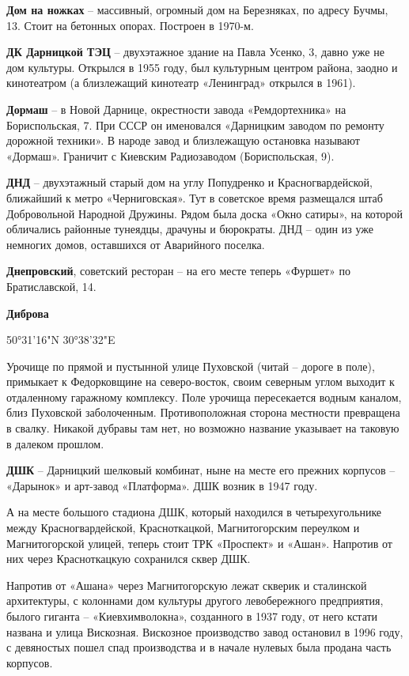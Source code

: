 \medskip

\textbf{Дом на ножках} – массивный, огромный дом на Березняках, по адресу Бучмы, 13. Стоит на бетонных опорах. Построен в 1970-м.\\

\medskip

\textbf{ДК Дарницкой ТЭЦ} – двухэтажное здание на Павла Усенко, 3, давно уже не дом культуры. Открылся в 1955 году, был культурным центром района, заодно и кинотеатром (а близлежащий кинотеатр «Ленинград» открылся в 1961).\\ 

\medskip

\textbf{Дормаш} – в Новой Дарнице, окрестности завода «Ремдортехника» на Бориспольская, 7. При СССР он именовался «Дарницким заводом по ремонту дорожной техники». В народе завод и близлежащую остановка называют «Дормаш». Граничит с Киевским Радиозаводом (Бориспольская, 9).\\

\medskip

\textbf{ДНД} – двухэтажный старый дом на углу Попудренко и Красногвардейской, ближайший к метро «Черниговская». Тут в советское время размещался штаб Добровольной Народной Дружины. Рядом была доска «Окно сатиры», на которой обличались районные тунеядцы, драчуны и бюрократы. ДНД – один из уже немногих домов, оставшихся от Аварийного поселка.\\

\medskip

\textbf{Днепровский}, советский ресторан – на его месте теперь «Фуршет» по Братиславской, 14.\\

\medskip

\textbf{Диброва}

50°31'16"N 30°38'32"E 

Урочище по прямой и пустынной улице Пуховской (читай – дороге в поле), примыкает к Федорковщине на северо-восток, своим северным углом выходит к отдаленному гаражному комплексу. Поле урочища пересекается водным каналом, близ Пуховской заболоченным. Противоположная сторона местности превращена в свалку. Никакой дубравы там нет, но возможно название указывает на таковую в далеком прошлом.\\

\medskip

\textbf{ДШК} – Дарницкий шелковый комбинат, ныне на месте его прежних корпусов – «Дарынок» и арт-завод «Платформа». ДШК возник в 1947 году.

А на месте большого стадиона ДШК, который находился в четырехугольнике между Красногвардейской, Красноткацкой, Магнитогорским переулком и Магнитогорской улицей, теперь стоит ТРК «Проспект» и «Ашан». Напротив от них через Красноткацкую сохранился сквер ДШК. 

Напротив от «Ашана» через Магнитогорскую лежат скверик и сталинской архитектуры, с колоннами дом культуры другого левобережного предприятия, былого гиганта – «Киевхимволокна», созданного в 1937 году, от него кстати названа и улица Вискозная. Вискозное производство завод остановил в 1996 году, с девяностых пошел спад производства и в начале нулевых была продана часть корпусов.